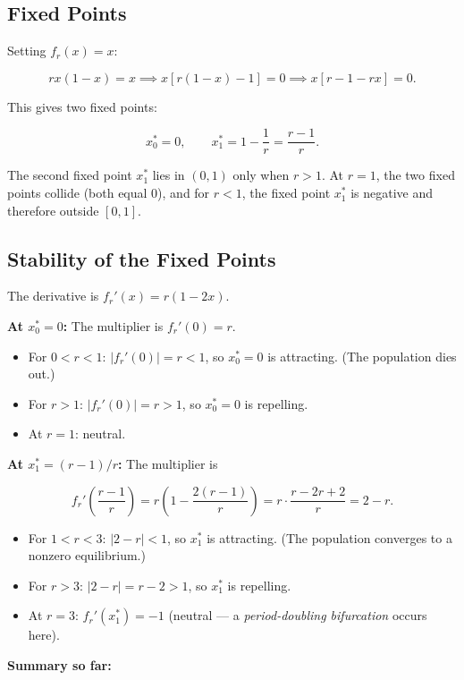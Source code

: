 \subsection{Fixed Points}\label{sec:2.4.1}

Setting $f_r(x) = x$:

\[
rx(1-x) = x \implies x[r(1-x) - 1] = 0 \implies x[r - 1 - rx] = 0.
\]

This gives two fixed points:

\[
x_0^* = 0, \qquad x_1^* = 1 - \frac{1}{r} = \frac{r-1}{r}.
\]

The second fixed point $x_1^*$ lies in $(0,1)$ only when $r > 1$. At $r = 1$, the two fixed points collide (both equal 0), and for $r < 1$, the fixed point $x_1^*$ is negative and therefore outside $[0,1]$.

\subsection{Stability of the Fixed Points}\label{sec:2.4.2}

The derivative is $f_r'(x) = r(1 - 2x)$.

\textbf{At $x_0^* = 0$:} The multiplier is $f_r'(0) = r$.

\begin{itemize}[nosep]
  \item For $0 < r < 1$: $|f_r'(0)| = r < 1$, so $x_0^* = 0$ is attracting. (The population dies out.)
  \item For $r > 1$: $|f_r'(0)| = r > 1$, so $x_0^* = 0$ is repelling.
  \item At $r = 1$: neutral.
\end{itemize}

\textbf{At $x_1^* = (r-1)/r$:} The multiplier is

\[
f_r'\!\left(\frac{r-1}{r}\right) = r\!\left(1 - \frac{2(r-1)}{r}\right) = r \cdot \frac{r - 2r + 2}{r} = 2 - r.
\]

\begin{itemize}[nosep]
  \item For $1 < r < 3$: $|2 - r| < 1$, so $x_1^*$ is attracting. (The population converges to a nonzero equilibrium.)
  \item For $r > 3$: $|2 - r| = r - 2 > 1$, so $x_1^*$ is repelling.
  \item At $r = 3$: $f_r'(x_1^*) = -1$ (neutral --- a \textit{period-doubling bifurcation} occurs here).
\end{itemize}

\textbf{Summary so far:}

